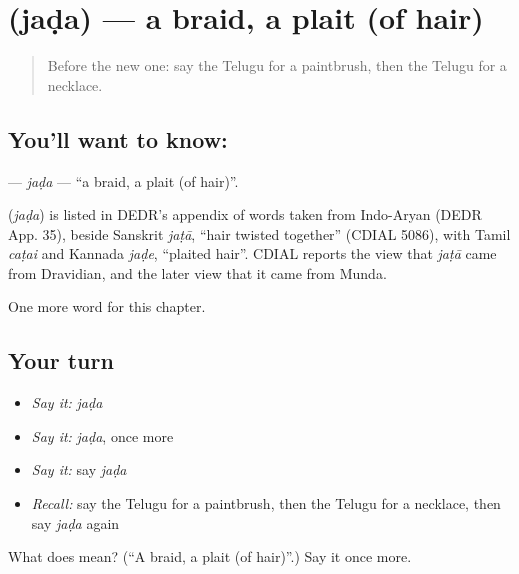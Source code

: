 \section[\texorpdfstring{\te{జడ} (jaḍa)}{జడ (jaḍa)}]{ (jaḍa) — a braid, a plait (of hair)}

\label{lesson:TE-C192-jada}



\begin{quote}
Before the new one: say the Telugu for a paintbrush, then the Telugu for a necklace.
\end{quote}

\subsection*{You'll want to know: }
\textbf{} — \emph{jaḍa} — \textquotedblleft{}a braid, a plait (of hair)\textquotedblright{}.

\begin{cousinweb}
\textbf{} (\emph{jaḍa}) is listed in DEDR's appendix of words taken from Indo-Aryan (DEDR App. 35), beside Sanskrit \emph{jaṭā}, \textquotedblleft{}hair twisted together\textquotedblright{} (CDIAL 5086), with Tamil \emph{caṭai} and Kannada \emph{jaḍe}, \textquotedblleft{}plaited hair\textquotedblright{}. CDIAL reports the view that \emph{jaṭā} came from Dravidian, and the later view that it came from Munda.
\end{cousinweb}

\begin{grammarlens}[title={What you've built}]
One more word for this chapter.
\end{grammarlens}

\subsection*{Your turn}
\begin{itemize}
\raggedright
  \item \emph{Say it:} \emph{jaḍa}
  \item \emph{Say it:} \emph{jaḍa}, once more
  \item \emph{Say it:} say \emph{jaḍa}
  \item \emph{Recall:} say the Telugu for a paintbrush, then the Telugu for a necklace, then say \emph{jaḍa} again
\end{itemize}

\begin{tcolorbox}[breakable,colback=teal!4,colframe=teal!35!black,title={Before you move on}]
What does  mean? (\textquotedblleft{}A braid, a plait (of hair)\textquotedblright{}.) Say it once more.
\end{tcolorbox}
